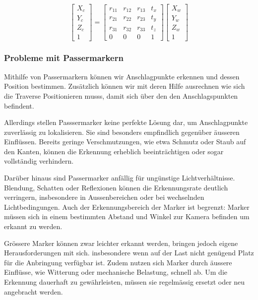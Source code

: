 \[
\begin{bmatrix}
X_c \\ 
Y_c \\ 
Z_c \\ 
1
\end{bmatrix}
=
\begin{bmatrix}
r_{11} & r_{12} & r_{13} & t_x \\
r_{21} & r_{22} & r_{23} & t_y \\
r_{31} & r_{32} & r_{33} & t_z \\
0 & 0 & 0 & 1
\end{bmatrix}
\begin{bmatrix}
X_w \\ 
Y_w \\ 
Z_w \\ 
1
\end{bmatrix}
\]

\subsubsection{Probleme mit Passermarkern}
Mithilfe von Passermarkern können wir Anschlagpunkte erkennen und dessen Position bestimmen.
Zusätzlich können wir mit deren Hilfe ausrechnen wie sich die Traverse Positionieren musss, damit
sich über den den Anschlagspunkten befindent.

Allerdings stellen Passsermarker keine perfekte Lösung dar, um Anschlagpunkte zuverlässig zu lokalisieren. 
Sie sind besonders empfindlich gegenüber äusseren Einflüssen. Bereits geringe Verschmutzungen, 
wie etwa Schmutz oder Staub auf den Kanten, können die Erkennung erheblich beeinträchtigen 
oder sogar vollständig verhindern.

Darüber hinaus sind Passermarker anfällig für ungünstige Lichtverhältnisse. Blendung, Schatten 
oder Reflexionen können die Erkennungsrate deutlich verringern, insbesondere in Aussenbereichen 
oder bei wechselnden Lichtbedingungen. Auch der Erkennungsbereich der Marker ist begrenzt: Marker 
müssen sich in einem bestimmten Abstand und Winkel zur Kamera befinden um erkannt zu werden.

Grössere Marker können zwar leichter erkannt werden, bringen jedoch eigene Herausforderungen mit sich. 
insbesondere wenn auf der Last nicht genügend Platz für die Anbringung verfügbar ist. Zudem nutzen 
sich Marker durch äussere Einflüsse, wie Witterung oder mechanische Belastung, schnell ab. Um die 
Erkennung dauerhaft zu gewährleisten, müssen sie regelmässig ersetzt oder neu angebracht werden.




